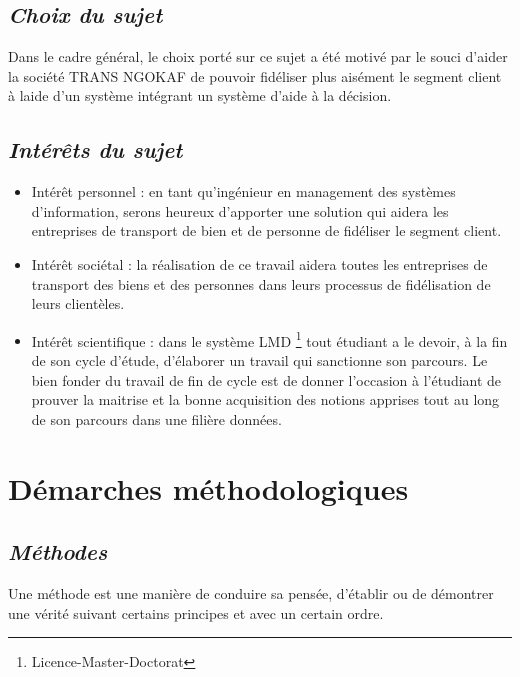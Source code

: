         \subsection[Choix du sujet]{\textit{Choix du sujet}}
        Dans le cadre général, le choix porté sur ce sujet a été motivé par le souci d’aider
        la société TRANS NGOKAF de pouvoir fidéliser plus aisément le segment client à laide d’un
        système intégrant un système d’aide à la décision.
        \subsection[Interet du sujet]{\textit{Intérêts du sujet}}
            \begin{itemize}
                \item [\ding{226}] Intérêt personnel : en tant qu’ingénieur en management 
                des systèmes d’information, serons heureux d’apporter une solution
                qui aidera les entreprises de transport de bien et de personne de fidéliser
                le segment client.
                \newline

                \item [\ding{226}] Intérêt sociétal : la réalisation de ce travail aidera toutes les
                entreprises de transport des biens et des personnes dans leurs processus de
                fidélisation de leurs clientèles.
                \newline

                \item [\ding{226}] Intérêt scientifique : dans le système LMD \footnote[1]{Licence-Master-Doctorat} tout étudiant
                a le devoir, à la fin de son cycle d’étude, d’élaborer un travail qui
                sanctionne son parcours. Le bien fonder du travail de fin de cycle
                est de donner l’occasion à l’étudiant de prouver la maitrise et la bonne acquisition
                des notions apprises tout au long de son parcours dans une filière données.
            \end{itemize}
    \section[Démarches méthodologiques]{Démarches méthodologiques}
        \subsection[Méthodes]{\textit{Méthodes}}
        Une méthode est une manière de conduire sa pensée, d’établir ou de démontrer une
        vérité suivant certains principes et avec un certain ordre.
        \newline

